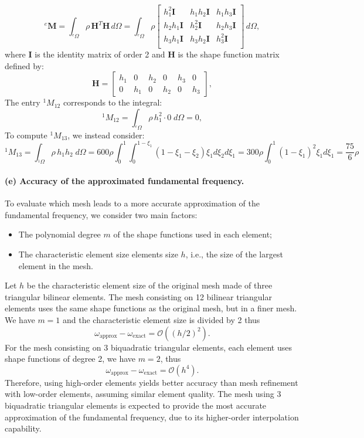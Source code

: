 \documentclass[12pt]{article}
\begin{document}
\[
	{}^e\mathbf{M} = \int_{{}^e\Omega} \rho \, \mathbf{H}^T \mathbf{H} \, d\Omega= \int_{{}^e\Omega} \rho \begin{bmatrix}
		h_1^2 \mathbf I  & h_1h_2 \mathbf I & h_1h_3 \mathbf I \\
		h_2h_1 \mathbf I & h_2^2 \mathbf I  & h_2h_3 \mathbf I \\
		h_3h_1 \mathbf I & h_3h_2 \mathbf I & h_3^2 \mathbf I  \\
	\end{bmatrix}  \, d\Omega,
\]
where \( \mathbf{I} \) is the identity matrix of order 2 and  \( \mathbf{H} \) is the shape function matrix defined by:
\[
	\mathbf{H} =
	\begin{bmatrix}
		h_1 & 0   & h_2 & 0   & h_3 & 0   \\
		0   & h_1 & 0   & h_2 & 0   & h_3
	\end{bmatrix},
\]
The entry \( {}^1M_{12} \) corresponds to the integral:
\[
	{}^1M_{12} = \int_{{}^e\Omega} \rho \, h_1^2 \cdot 0 \; d\Omega = 0,
\]
To compute \( {}^1M_{13} \), we instead consider:
$$
	{}^1M_{13} = \int_{{}^1\Omega} \rho \, h_1 h_2 \; d\Omega=600\rho \int_0^1\int_0^{1-\xi_1} (1-\xi_1-\xi_2)\xi_1 d\xi_2d\xi_1
	=300\rho \int_0^1(1-\xi_1)^2\xi_1 d\xi_1 =\frac{75}{6}\rho
$$

\paragraph*{(e) Accuracy of the approximated fundamental frequency.} To evaluate which mesh leads to a more accurate approximation of the fundamental frequency, we consider two main factors:
\begin{itemize}
	\item The polynomial degree $m$ of the shape functions used in each element;
	\item The characteristic element size elements size $h$, i.e., the size of the largest element in the mesh.
\end{itemize}
Let $h$ be the characteristic element size of the original mesh made of three  triangular bilinear elements. The mesh consisting on 12 bilinear triangular elements uses the same shape functions as the original mesh, but in a finer mesh. We have $m=1$ and the characteristic element size is divided by 2 thus
\[
	\omega_{\text{approx}} - \omega_{\text{exact}} = \mathcal{O}((h/2)^2).
\]
For the mesh consisting on 3 biquadratic triangular elements, each element uses shape functions of degree 2, we have $m=2$, thus
\[
	\omega_{\text{approx}} - \omega_{\text{exact}} = \mathcal{O}(h^4).
\]
Therefore, using high-order elements yields better accuracy than mesh refinement with low-order elements, assuming similar element quality. The mesh using 3 biquadratic triangular elements is expected to provide the most accurate approximation of the fundamental frequency, due to its higher-order interpolation capability.
\end{document}
